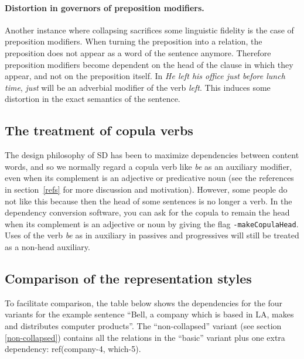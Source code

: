 \documentclass[11pt,letter]{article}
\begin{document}
\paragraph{Distortion in governors of preposition modifiers.}
Another instance where collapsing sacrifices some linguistic fidelity is the case of preposition modifiers. When turning the preposition into a relation, the preposition does not appear as a word of the sentence anymore. Therefore preposition modifiers become dependent on the head of the clause in which they appear, and not on the preposition itself. In \emph{He left his office just before lunch time}, \emph{just} will be an adverbial modifier of the verb \emph{left}. This induces some distortion in the exact semantics of the sentence.

\subsection{The treatment of copula verbs}
The design philosophy of SD has been to maximize dependencies between
content words, and so we normally regard a copula verb like \emph{be}
as an auxiliary modifier, even when its complement is an adjective or
predicative noun (see the references in section~\ref{refs} for more discussion and motivation).  However, some people do not like this because then the head of some sentences is no longer a verb.  In the dependency conversion software, you can ask for the copula to remain the head when its complement is an adjective or noun by giving the flag \texttt{-makeCopulaHead}.  Uses of the verb \emph{be} as in auxiliary in passives and progressives will still be treated as a non-head auxiliary.

\subsection{Comparison of the representation styles}
\noindent To facilitate comparison, the table below shows the dependencies for the four variants for the example sentence ``Bell, a company which is based in LA, makes and distributes computer products''. The ``non-collapsed'' variant (see section \ref{non-collapsed}) contains all the relations in the ``basic'' variant plus one extra dependency: ref(company-4, which-5).

\bigskip
\end{document}
